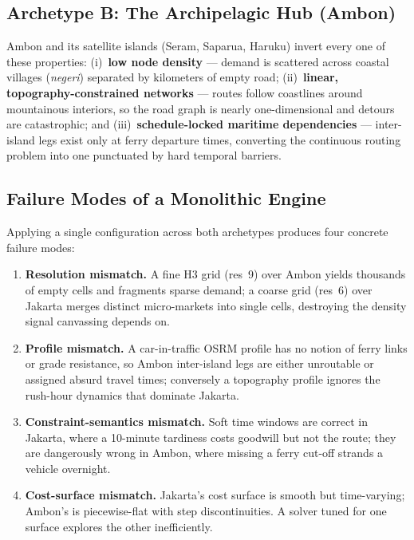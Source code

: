 \documentclass[11pt,a4paper,twocolumn]{article}
\begin{document}
\subsection{Archetype B: The Archipelagic Hub (Ambon)}

Ambon and its satellite islands (Seram, Saparua, Haruku) invert every one
of these properties: (i)~\textbf{low node density} --- demand is scattered
across coastal villages (\emph{negeri}) separated by kilometers of empty
road; (ii)~\textbf{linear, topography-constrained networks} --- routes
follow coastlines around mountainous interiors, so the road graph is nearly
one-dimensional and detours are catastrophic; and
(iii)~\textbf{schedule-locked maritime dependencies} --- inter-island legs
exist only at ferry departure times, converting the continuous routing
problem into one punctuated by hard temporal barriers.

\subsection{Failure Modes of a Monolithic Engine}

Applying a single configuration across both archetypes produces four
concrete failure modes:

\begin{enumerate}[leftmargin=1.4em, itemsep=0.15em]
  \item \textbf{Resolution mismatch.} A fine H3 grid (res~9) over Ambon
    yields thousands of empty cells and fragments sparse demand;
    a coarse grid (res~6) over Jakarta merges distinct micro-markets into
    single cells, destroying the density signal canvassing depends on.
  \item \textbf{Profile mismatch.} A car-in-traffic OSRM profile has no
    notion of ferry links or grade resistance, so Ambon inter-island legs
    are either unroutable or assigned absurd travel times; conversely a
    topography profile ignores the rush-hour dynamics that dominate
    Jakarta.
  \item \textbf{Constraint-semantics mismatch.} Soft time windows are
    correct in Jakarta, where a 10-minute tardiness costs goodwill but not
    the route; they are dangerously wrong in Ambon, where missing a ferry
    cut-off strands a vehicle overnight.
  \item \textbf{Cost-surface mismatch.} Jakarta's cost surface is smooth
    but time-varying; Ambon's is piecewise-flat with step discontinuities.
    A solver tuned for one surface explores the other inefficiently.
\end{enumerate}
\end{document}
